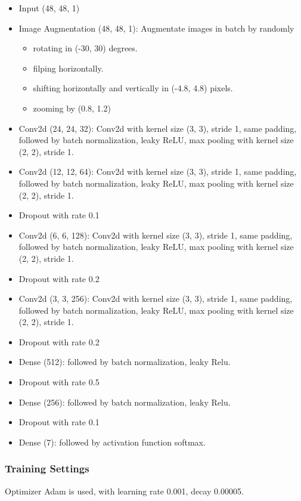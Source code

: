 \documentclass[fleqn,a4paper,12pt]{article}
\begin{document}
\begin{itemize}
\item
  Input (48, 48, 1)
\item
  Image Augmentation (48, 48, 1): Augmentate images in batch by randomly
  \begin{itemize}
  \item rotating in (-30, 30) degrees.
  \item filping horizontally.
  \item shifting horizontally and vertically in (-4.8, 4.8) pixels.
  \item zooming by (0.8, 1.2)
  \end{itemize}
\item
  Conv2d (24, 24, 32): Conv2d with kernel size (3, 3), stride 1, same padding, followed by batch normalization, leaky ReLU, max pooling with kernel size (2, 2), stride 1.
\item
  Conv2d (12, 12, 64): Conv2d with kernel size (3, 3), stride 1, same padding, followed by batch normalization, leaky ReLU, max pooling with kernel size (2, 2), stride 1.
\item
  Dropout with rate 0.1
\item
  Conv2d (6, 6, 128): Conv2d with kernel size (3, 3), stride 1, same padding, followed by batch normalization, leaky ReLU, max pooling with kernel size (2, 2), stride 1.
\item
  Dropout with rate 0.2
\item
  Conv2d (3, 3, 256): Conv2d with kernel size (3, 3), stride 1, same padding, followed by batch normalization, leaky ReLU, max pooling with kernel size (2, 2), stride 1.
\item
  Dropout with rate 0.2
\item Dense (512): followed by batch normalization, leaky Relu.
\item
  Dropout with rate 0.5
\item Dense (256): followed by batch normalization, leaky Relu.
\item
  Dropout with rate 0.1
\item
  Dense (7): followed by activation function softmax.
\end{itemize}

\subsubsection*{Training Settings}

Optimizer Adam is used, with learning rate 0.001, decay 0.00005.
\end{document}
